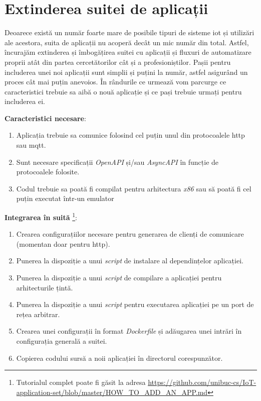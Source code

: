 
\section{Extinderea suitei de aplicații}

Deoarece există un număr foarte mare de posibile tipuri de sisteme \acrshort{iot} și utilizări ale acestora, suita de aplicații nu acoperă decât un mic număr din total. Astfel, încurajăm extinderea și îmbogățirea suitei cu aplicații și fluxuri de automatizare proprii atât din partea cercetătorilor cât și a profesioniștilor. Pașii pentru includerea unei noi aplicații sunt simplii și puțini la număr, astfel asigurând un proces cât mai puțin anevoios. În rândurile ce urmează vom parcurge ce caracteristici trebuie sa aibă o nouă aplicație și ce pași trebuie urmați pentru includerea ei.

\textbf{Caracteristici necesare}:
\begin{enumerate}
    \item Aplicația trebuie sa comunice folosind cel puțin unul din protocoalele \acrshort{http} sau \acrshort{mqtt}.
    \item Sunt necesare specificații \textit{OpenAPI} și/sau \textit{AsyncAPI} în funcție de protocoalele folosite.
    \item Codul trebuie sa poată fi compilat pentru arhitectura \textit{x86} sau să poată fi cel puțin executat într-un emulator
\end{enumerate}

\textbf{Integrarea în suită} \footnote{Tutorialul complet poate fi găsit la adresa \url{https://github.com/unibuc-cs/IoT-application-set/blob/master/HOW_TO_ADD_AN_APP.md}}:
\begin{enumerate}
    \item Crearea configurațiilor necesare pentru generarea de clienți de comunicare (momentan doar pentru \acrshort{http}).
    \item Punerea la dispoziție a unui \textit{script} de instalare al dependințelor aplicației.
    \item Punerea la dispoziție a unui \textit{script} de compilare a aplicației pentru arhitecturile țintă.
    \item Punerea la dispoziție a unui \textit{script} pentru executarea aplicației pe un port de rețea arbitrar.
    \item Crearea unei configurații în format \textit{Dockerfile} și adăugarea unei intrări în configurația generală a suitei.
    \item Copierea codului sursă a noii aplicației în directorul corespunzător.
\end{enumerate}

